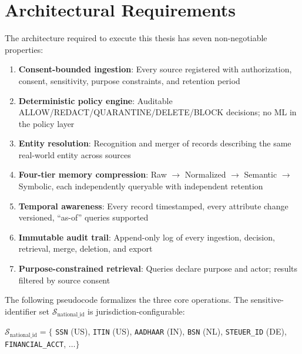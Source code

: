 \documentclass[11pt,twocolumn]{article}
\begin{document}
\section{Architectural Requirements}
\label{sec:architecture}

The architecture required to execute this thesis has seven non-negotiable properties:

\begin{enumerate}[nosep,leftmargin=1.5em]
  \item \textbf{Consent-bounded ingestion}: Every source registered with authorization, consent, sensitivity, purpose constraints, and retention period
  \item \textbf{Deterministic policy engine}: Auditable ALLOW/REDACT/QUARANTINE/DELETE/BLOCK decisions; no ML in the policy layer
  \item \textbf{Entity resolution}: Recognition and merger of records describing the same real-world entity across sources
  \item \textbf{Four-tier memory compression}: Raw $\rightarrow$ Normalized $\rightarrow$ Semantic $\rightarrow$ Symbolic, each independently queryable with independent retention
  \item \textbf{Temporal awareness}: Every record timestamped, every attribute change versioned, ``as-of'' queries supported
  \item \textbf{Immutable audit trail}: Append-only log of every ingestion, decision, retrieval, merge, deletion, and export
  \item \textbf{Purpose-constrained retrieval}: Queries declare purpose and actor; results filtered by source consent
\end{enumerate}

The following pseudocode formalizes the three core operations. The sensitive-identifier set $\mathcal{S}_{\text{national\_id}}$ is jurisdiction-configurable:

\smallskip
{\small
\noindent$\mathcal{S}_{\text{national\_id}} = \{$%
\texttt{SSN} (US),
\texttt{ITIN} (US),
\texttt{AADHAAR} (IN),
\texttt{BSN} (NL),
\texttt{STEUER\_ID} (DE),
\texttt{FINANCIAL\_ACCT},
$\ldots\}$
}
\smallskip
\end{document}
